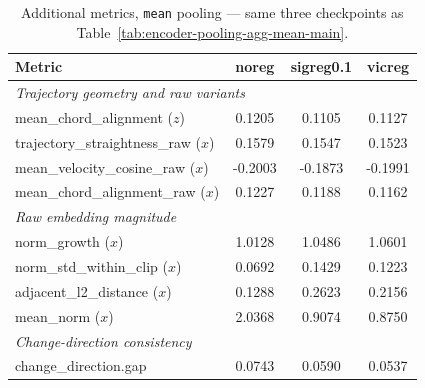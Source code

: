 \begin{table}[H]
\centering
\caption{Additional metrics, \texttt{mean} pooling --- same three checkpoints as
Table~\ref{tab:encoder-pooling-agg-mean-main}.}
\label{tab:encoder-pooling-agg-mean-additional}
\begin{tabular}{lccc}
\toprule
Metric & noreg & sigreg0.1 & vicreg \\
\midrule
\multicolumn{4}{l}{\textit{Trajectory geometry and raw variants}} \\
mean\_chord\_alignment ($z$) & 0.1205 & 0.1105 & 0.1127 \\
trajectory\_straightness\_raw ($x$) & 0.1579 & 0.1547 & 0.1523 \\
mean\_velocity\_cosine\_raw ($x$) & -0.2003 & -0.1873 & -0.1991 \\
mean\_chord\_alignment\_raw ($x$) & 0.1227 & 0.1188 & 0.1162 \\
\midrule
\multicolumn{4}{l}{\textit{Raw embedding magnitude}} \\
norm\_growth ($x$) & 1.0128 & 1.0486 & 1.0601 \\
norm\_std\_within\_clip ($x$) & 0.0692 & 0.1429 & 0.1223 \\
adjacent\_l2\_distance ($x$) & 0.1288 & 0.2623 & 0.2156 \\
mean\_norm ($x$) & 2.0368 & 0.9074 & 0.8750 \\
\midrule
\multicolumn{4}{l}{\textit{Change-direction consistency}} \\
change\_direction.gap & 0.0743 & 0.0590 & 0.0537 \\
\bottomrule
\end{tabular}
\end{table}

